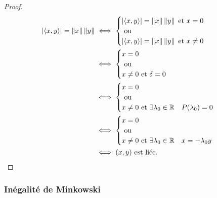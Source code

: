 \begin{proof}
  \begin{align*}
    \left\lvert\left\langle{x},{y}\right\rangle\right\rvert=\left\lVert x\right\rVert\left\lVert y\right\rVert
    &\iff
    \begin{cases}
      \left\lvert\left\langle{x},{y}\right\rangle\right\rvert=\left\lVert x\right\rVert\left\lVert y\right\rVert \text{~et~} x=0 \\ \text{~ou~} \\
      \left\lvert\left\langle{x},{y}\right\rangle\right\rvert=\left\lVert x\right\rVert\left\lVert y\right\rVert \text{~et~} x\neq 0
    \end{cases}\\
    &\iff
    \begin{cases}
      x=0 \\ \text{~ou~} \\
      x\neq 0 \text{~et~}  \delta=0
    \end{cases}\\
    &\iff
    \begin{cases}
      x=0 \\ \text{~ou~} \\
      x\neq 0 \text{~et~}  \exists \lambda_0 \in \mathbb{R} \quad P(\lambda_0)=0
    \end{cases}\\
    &\iff
    \begin{cases}
      x=0 \\ 
      \text{~ou~} \\
      x\neq 0 \text{~et~}  \exists \lambda_0 \in \mathbb{R} \quad x=-\lambda_0 y
    \end{cases}\\
    &\iff (x,y) \text{~est liée}.
  \end{align*}
\end{proof}

\subsubsection{Inégalité de Minkowski}

